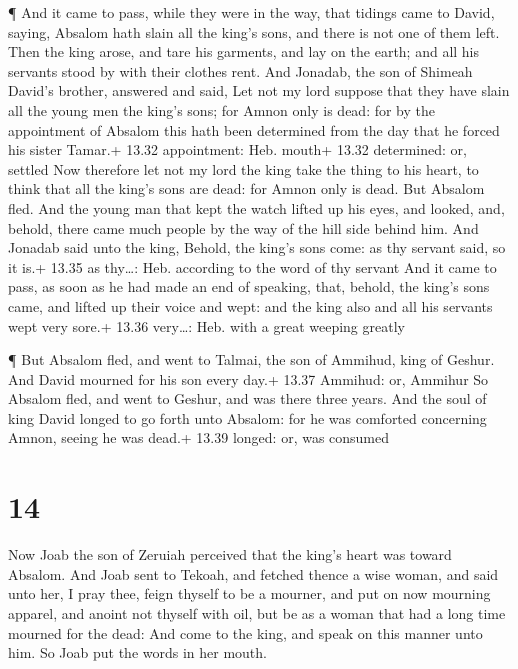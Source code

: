  ¶ And it came to pass, while they were in the way, that
tidings came to David, saying, Absalom hath slain all the king's sons,
and there is not one of them left.  Then the king arose,
and tare his garments, and lay on the earth; and all his servants stood
by with their clothes rent.  And Jonadab, the son of
Shimeah David's brother, answered and said, Let not my lord suppose that
they have slain all the young men the king's sons; for Amnon only is
dead: for by the appointment of Absalom this hath been determined from
the day that he forced his sister Tamar.+ 13.32 appointment: Heb. mouth+
13.32 determined: or, settled  Now therefore let not my
lord the king take the thing to his heart, to think that all the king's
sons are dead: for Amnon only is dead.  But Absalom fled.
And the young man that kept the watch lifted up his eyes, and looked,
and, behold, there came much people by the way of the hill side behind
him.  And Jonadab said unto the king, Behold, the king's
sons come: as thy servant said, so it is.+ 13.35 as thy\ldots: Heb.
according to the word of thy servant  And it came to pass,
as soon as he had made an end of speaking, that, behold, the king's sons
came, and lifted up their voice and wept: and the king also and all his
servants wept very sore.+ 13.36 very\ldots: Heb. with a great weeping
greatly

 ¶ But Absalom fled, and went to Talmai, the son of
Ammihud, king of Geshur. And David mourned for his son every day.+ 13.37
Ammihud: or, Ammihur  So Absalom fled, and went to Geshur,
and was there three years.  And the soul of king David
longed to go forth unto Absalom: for he was comforted concerning Amnon,
seeing he was dead.+ 13.39 longed: or, was consumed

\hypertarget{section-13}{%
\section{14}\label{section-13}}

 Now Joab the son of Zeruiah perceived that the king's heart
was toward Absalom.  And Joab sent to Tekoah, and fetched
thence a wise woman, and said unto her, I pray thee, feign thyself to be
a mourner, and put on now mourning apparel, and anoint not thyself with
oil, but be as a woman that had a long time mourned for the dead:
 And come to the king, and speak on this manner unto him. So
Joab put the words in her mouth.

